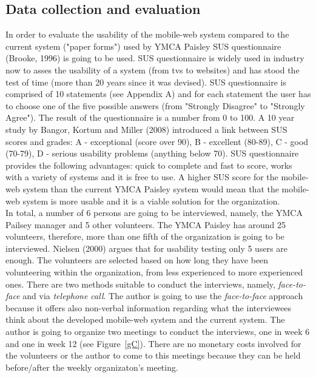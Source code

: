 \documentclass[version=last,fontsize=13pt]{scrartcl}
\begin{document}
\subsection{Data collection and evaluation}
	In order to evaluate the usability of the mobile-web system compared to the current system ("paper forms") used by YMCA Paisley SUS questionnaire (Brooke, 1996) is going to be used. SUS questionnaire is widely used in industry now to asses the usability of a system (from tvs to websites) and has stood the test of time (more than 20 years since it was devised). SUS questionnaire is comprised of 10 statements (see Appendix A) and for each statement the user has to choose one of the five possible answers (from "Strongly Disagree" to "Strongly Agree"). The result of the questionnaire is a number from 0 to 100. A 10 year study by Bangor, Kortum and Miller (2008) introduced a link between SUS scores and grades: A - exceptional (score over 90), B - excellent (80-89), C - good (70-79), D - serious usability problems (anything below 70). SUS questionnaire provides the following advantages: quick to complete and fast to score, works with a variety of systems and it is free to use. A higher SUS score for the mobile-web system than the current YMCA Paisley system would mean that the mobile-web system is more usable and it is a viable solution for the organization.\\
	\indent
	In total, a number of 6 persons are going to be interviewed, namely, the YMCA Pailsey manager and 5 other volunteers. The YMCA Paisley has around 25 volunteers, therefore, more than one fifth of the organization is going to be interviewed. Nielsen (2000) argues that for usability testing  only 5 users are enough. The volunteers are selected based on how long they have been volunteering within the organization, from less experienced to more experienced ones. There are two methods suitable to conduct the interviews, namely, \textit{face-to-face} and via \textit{telephone call}. %
	The author is going to use the \textit{face-to-face} approach because it offers also non-verbal information regarding what the interviewees think about the developed mobile-web system and the current system.  The author is going to organize two meetings to conduct the interviews, one in week 6 and one in week 12 (see Figure~\ref{gC}). There are no monetary costs involved for the volunteers or the author to come to this meetings because they can be held before/after the weekly organizaton's meeting. %
\end{document}
